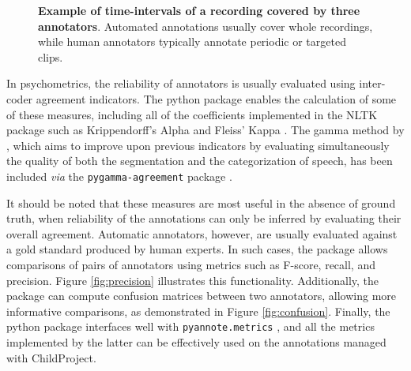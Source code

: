 \documentclass[smallextended]{svjour3}       %
\begin{document}
\begin{figure}[htb]
\centering
{}


\caption{\label{fig:Annotation}\textbf{Example of time-intervals of a recording covered by three annotators}. Automated annotations usually cover whole recordings, while human annotators typically annotate periodic or targeted clips. }

\end{figure}

In psychometrics, the reliability of annotators is usually evaluated using inter-coder agreement indicators. The python package enables the calculation of some of these measures, including all of the coefficients implemented in the NLTK package \citep{nltk} such as Krippendorff's Alpha \citep{alpha} and Fleiss' Kappa \citep{kappa}. The gamma method by \citet{gamma}, which aims to improve upon previous indicators by evaluating simultaneously the quality of both the segmentation and the categorization of speech, has been included \emph{via} the \texttt{pygamma-agreement} package \citep{pygamma_agreement}.

It should be noted that these measures are most useful in the absence of ground truth, when reliability of the annotations can only be inferred by evaluating their overall agreement. Automatic annotators, however, are usually evaluated against a gold standard produced by human experts. In such cases, the package allows comparisons of pairs of annotators using metrics such as F-score, recall, and precision. Figure \ref{fig:precision} illustrates this functionality. Additionally, the package can compute confusion matrices between two annotators, allowing more informative comparisons, as demonstrated in Figure \ref{fig:confusion}. Finally, the python package interfaces well with \texttt{pyannote.metrics} \citep{pyannote.metrics}, and all the metrics implemented by the latter can be effectively used on the annotations managed with ChildProject.
\end{document}

